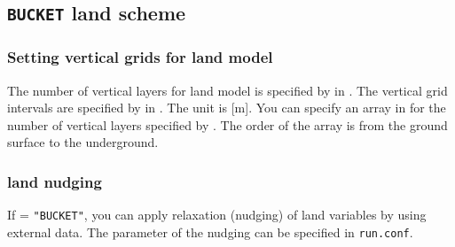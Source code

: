 \subsection{\texttt{BUCKET} land scheme}
\subsubsection{Setting vertical grids for land model}

The number of vertical layers for land model is specified by  in .
The vertical grid intervals are specified by  in . The unit is [m].
You can specify an array in  for the number of vertical layers specified by .
The order of the array is from the ground surface to the underground.


\subsubsection{land nudging}

If  = \verb|"BUCKET"|, you can apply relaxation (nudging) of land variables by using external data.
The parameter of the nudging can be specified in \verb|run.conf|.

